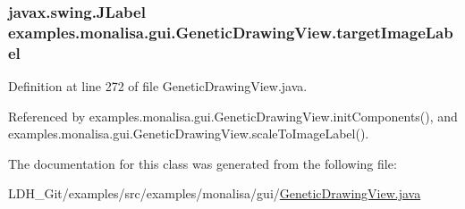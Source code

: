 \hypertarget{classexamples_1_1monalisa_1_1gui_1_1_genetic_drawing_view_a38fa970d741f300058eac2035a05f6e0}{
\subsubsection[{target\-Image\-Label}]{\setlength{\rightskip}{0pt plus 5cm}javax.\-swing.\-J\-Label examples.\-monalisa.\-gui.\-Genetic\-Drawing\-View.\-target\-Image\-Label\hspace{0.3cm}{\ttfamily [private]}}}\label{classexamples_1_1monalisa_1_1gui_1_1_genetic_drawing_view_a38fa970d741f300058eac2035a05f6e0}


Definition at line 272 of file Genetic\-Drawing\-View.\-java.



Referenced by examples.\-monalisa.\-gui.\-Genetic\-Drawing\-View.\-init\-Components(), and examples.\-monalisa.\-gui.\-Genetic\-Drawing\-View.\-scale\-To\-Image\-Label().



The documentation for this class was generated from the following file\-:\begin{DoxyCompactItemize}
\item 
L\-D\-H\-\_\-\-Git/examples/src/examples/monalisa/gui/\hyperlink{monalisa_2gui_2_genetic_drawing_view_8java}{Genetic\-Drawing\-View.\-java}\end{DoxyCompactItemize}
